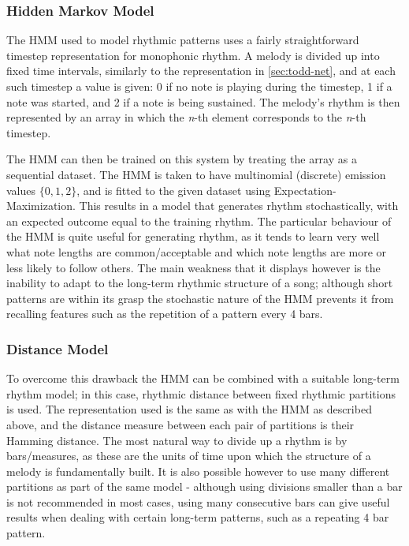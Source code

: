 \documentclass[ author={Stephen Livermore-Tozer},
				supervisor={Dr. Peter Flach},
				degree={MEng},
				title={Performing Algorithmic Co-composition Using Machine Learning},
				subtitle={},
				type={research},
				year={2016} ]{dissertation}
\begin{document}
	\subsubsection{Hidden Markov Model}
	
	The HMM used to model rhythmic patterns uses a fairly straightforward timestep representation for monophonic rhythm. A melody is divided up into fixed time intervals, similarly to the representation in \ref{sec:todd-net}, and at each such timestep a value is given: 0 if no note is playing during the timestep, 1 if a note was started, and 2 if a note is being sustained. The melody's rhythm is then represented by an array in which the \textit{n}-th element corresponds to the \textit{n}-th timestep.
	
	The HMM can then be trained on this system by treating the array as a sequential dataset. The HMM is taken to have multinomial (discrete) emission values $\{0,1,2\}$, and is fitted to the given dataset using Expectation-Maximization. This results in a model that generates rhythm stochastically, with an expected outcome equal to the training rhythm. The particular behaviour of the HMM is quite useful for generating rhythm, as it tends to learn very well what note lengths are common/acceptable and which note lengths are more or less likely to follow others. The main weakness that it displays however is the inability to adapt to the long-term rhythmic structure of a song; although short patterns are within its grasp the stochastic nature of the HMM prevents it from recalling features such as the repetition of a pattern every 4 bars. 
	
	\subsubsection{Distance Model}
	
	To overcome this drawback the HMM can be combined with a suitable long-term rhythm model; in this case, rhythmic distance between fixed rhythmic partitions is used. The representation used is the same as with the HMM as described above, and the distance measure between each pair of partitions is their Hamming distance. The most natural way to divide up a rhythm is by bars/measures, as these are the units of time upon which the structure of a melody is fundamentally built. It is also possible however to use many different partitions as part of the same model - although using divisions smaller than a bar is not recommended in most cases, using many consecutive bars can give useful results when dealing with certain long-term patterns, such as a repeating 4 bar pattern.
	
\end{document}
